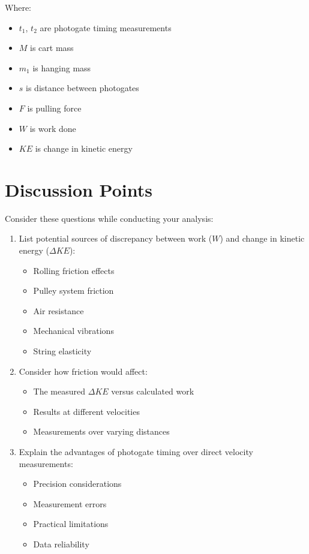 \documentclass[12pt]{article}
\begin{document}
Where:
\begin{itemize}
\item $t_1$, $t_2$ are photogate timing measurements
\item $M$ is cart mass
\item $m_1$ is hanging mass
\item $s$ is distance between photogates
\item $F$ is pulling force
\item $W$ is work done
\item $KE$ is change in kinetic energy

\end{itemize}

\section{Discussion Points}

Consider these questions while conducting your analysis:

\begin{enumerate}
\item List potential sources of discrepancy between work ($W$) and change in kinetic energy ($\Delta KE$):
    \begin{itemize}
    \item Rolling friction effects
    \item Pulley system friction
    \item Air resistance
    \item Mechanical vibrations
    \item String elasticity
    \end{itemize}

\item Consider how friction would affect:
    \begin{itemize}
    \item The measured $\Delta KE$ versus calculated work
    \item Results at different velocities
    \item Measurements over varying distances
    \end{itemize}

\item Explain the advantages of photogate timing over direct velocity measurements:
    \begin{itemize}
    \item Precision considerations
    \item Measurement errors
    \item Practical limitations
    \item Data reliability
    \end{itemize}
\end{enumerate}
\end{document}
